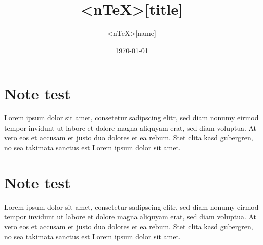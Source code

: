 \documentclass{report}
\title{\Huge{<nTeX>[title]}}
\author{\huge{<nTeX>[name]}}
\date{\today}
\begin{document}
\maketitle
{}
\tableofcontents
\pagebreak

\chapter{Note test}

Lorem ipsum dolor sit amet, consetetur sadipscing elitr, sed diam nonumy eirmod tempor invidunt ut labore et dolore magna aliquyam erat, sed diam voluptua. At vero eos et accusam et justo duo dolores et ea rebum. Stet clita kasd gubergren, no sea takimata sanctus est Lorem ipsum dolor sit amet.

\chapter{Note test}

Lorem ipsum dolor sit amet, consetetur sadipscing elitr, sed diam nonumy eirmod tempor invidunt ut labore et dolore magna aliquyam erat, sed diam voluptua. At vero eos et accusam et justo duo dolores et ea rebum. Stet clita kasd gubergren, no sea takimata sanctus est Lorem ipsum dolor sit amet.



\end{document}
